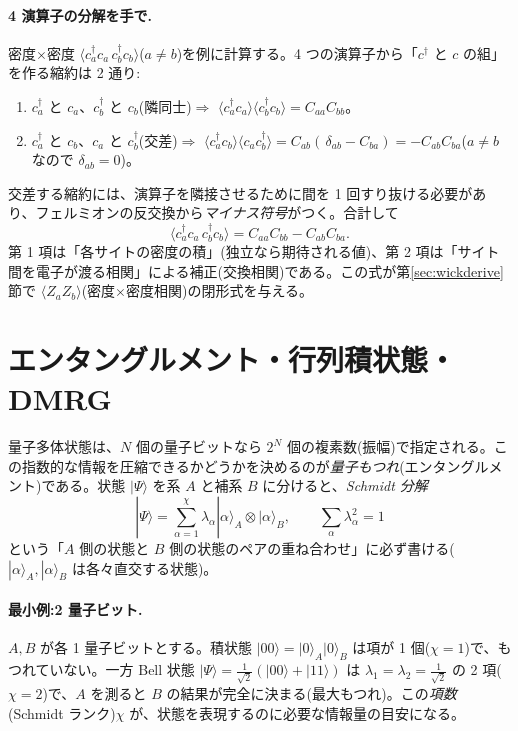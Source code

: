 \documentclass[11pt,a4paper]{ltjsarticle}
\newcommand{\ket}[1]{|#1\rangle}
\newcommand{\ev}[1]{\langle #1\rangle}
\newcommand{\cd}{c^\dagger}
\begin{document}
\paragraph{4 演算子の分解を手で.}密度$\times$密度 $\ev{\cd_a c_a\,\cd_b c_b}$($a\ne b$)を例に計算する。4 つの演算子から「$\cd$ と $c$ の組」を作る縮約は 2 通り:
\begin{enumerate}
  \item $\cd_a$ と $c_a$、$\cd_b$ と $c_b$(隣同士)$\Rightarrow$ $\ev{\cd_a c_a}\ev{\cd_b c_b}=C_{aa}C_{bb}$。
  \item $\cd_a$ と $c_b$、$c_a$ と $\cd_b$(交差)$\Rightarrow$ $\ev{\cd_a c_b}\ev{c_a\cd_b}=C_{ab}(\,\delta_{ab}-C_{ba})=-C_{ab}C_{ba}$($a\ne b$ なので $\delta_{ab}=0$)。
\end{enumerate}
交差する縮約には、演算子を隣接させるために間を 1 回すり抜ける必要があり、フェルミオンの反交換から\emph{マイナス符号}がつく。合計して
\begin{equation}
  \ev{\cd_a c_a\,\cd_b c_b} = C_{aa}C_{bb} - C_{ab}C_{ba}.
  \label{eq:wick4}
\end{equation}
第 1 項は「各サイトの密度の積」(独立なら期待される値)、第 2 項は「サイト間を電子が渡る相関」による補正(交換相関)である。この式が第\ref{sec:wickderive}節で $\ev{Z_aZ_b}$(密度$\times$密度相関)の閉形式を与える。

\section{エンタングルメント・行列積状態・DMRG}
\label{sec:mps}

量子多体状態は、$N$ 個の量子ビットなら $2^N$ 個の複素数(振幅)で指定される。この指数的な情報を圧縮できるかどうかを決めるのが\emph{量子もつれ}(エンタングルメント)である。状態 $\ket{\Psi}$ を系 $A$ と補系 $B$ に分けると、\emph{Schmidt 分解}
\begin{equation}
  \ket{\Psi} = \sum_{\alpha=1}^{\chi} \lambda_\alpha \ket{\alpha}_A\otimes\ket{\alpha}_B,\qquad \sum_\alpha\lambda_\alpha^2=1
\end{equation}
という「$A$ 側の状態と $B$ 側の状態のペアの重ね合わせ」に必ず書ける($\ket{\alpha}_A,\ket{\alpha}_B$ は各々直交する状態)。

\paragraph{最小例:2 量子ビット.}$A,B$ が各 1 量子ビットとする。積状態 $\ket{00}=\ket0_A\ket0_B$ は項が 1 個($\chi=1$)で、もつれていない。一方 Bell 状態 $\ket{\Psi}=\frac1{\sqrt2}(\ket{00}+\ket{11})$ は $\lambda_1=\lambda_2=\frac1{\sqrt2}$ の 2 項($\chi=2$)で、$A$ を測ると $B$ の結果が完全に決まる(最大もつれ)。この\emph{項数}(Schmidt ランク)$\chi$ が、状態を表現するのに必要な情報量の目安になる。
\end{document}
